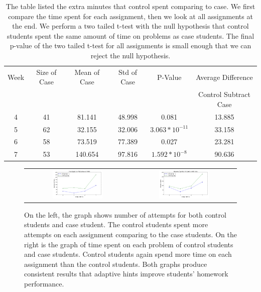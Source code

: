 \documentclass{llncs2e/llncs}
\begin{document}
\begin{table}
\caption{The table listed the extra minutes that control spent comparing to case. We first compare the time spent for each assignment, then we look at all assignments at the end. We perform a two tailed t-test with the null hypothesis that control students spent the same amount of time on problems as case students. The final p-value of the two tailed t-test for all assignments is small enough that we can reject the null hypothesis.}
\begin{center}
  \begin{tabular}{| c | c | c | c | c | c |}
    \hline
   Week & Size of Case & Mean of Case & Std of Case &  P-Value & Average Difference \\
      & & & & & Control Subtract Case  \\ \hline
	4 & 41 & 81.141 & 48.998 & 0.081 & 13.885\\
	5 & 62 & 32.155 & 32.006 & $3.063 * 10^{-11}$ & 33.158\\
	6 & 58 & 73.519 & 77.389 & 0.027 & 23.281 \\
	7 & 53 & 140.654 & 97.816 & $1.592 * 10^{-8}$ & 90.636 \\
	\hline
  \end{tabular}
  \label{tab:no_hint_time}
  \end{center}
\end{table}

\begin{figure}[ht]
\centering
   \begin{tabular}{c c}
		\includegraphics[width=0.5\textwidth]{image/assignment_tries_downstream.png} &
		\includegraphics[width=0.5\textwidth]{image/assignment_time_downstream.png}
	\end{tabular}
\caption{On the left, the graph shows number of attempts for both control students and case student. The control students spent more attempts on each assignment comparing to the case students. On the right is the graph of time spent on each problem of control students and case students. Control students again spend more time on each assignment than the control students. Both graphs produce consistent results that adaptive hints improve students' homework performance.}
    \label{fig:downstream_analysis}
\end{figure}
\end{document}
